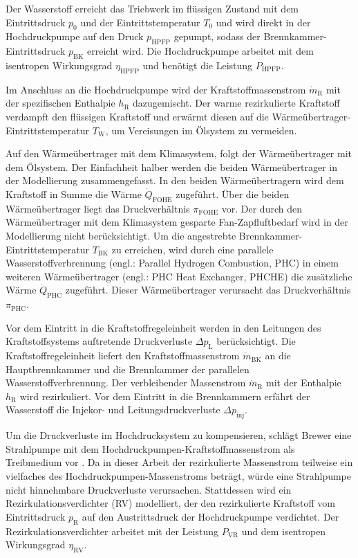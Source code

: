 Der Wasserstoff erreicht das Triebwerk im flüssigen Zustand mit dem Eintrittsdruck $p_0$ und der Eintrittstemperatur $T_0$ und wird direkt in der Hochdruckpumpe auf den Druck $p_{\mathrm{HPFP}}$ gepumpt, sodass der Brennkammer-Eintrittsdruck $p_{\mathrm{BK}}$ erreicht wird. Die Hochdruckpumpe arbeitet mit dem isentropen Wirkungsgrad $\eta_{\mathrm{HPFP}}$ und benötigt die Leistung $P_{\mathrm{HPFP}}$. 

Im Anschluss an die Hochdruckpumpe wird der Kraftstoffmassenstrom $\dot{m}_\mathrm{R}$ mit der spezifischen Enthalpie $h_\mathrm{R}$ dazugemischt. Der warme rezirkulierte Kraftstoff verdampft den flüssigen Kraftstoff und erwärmt diesen auf die Wärmeübertrager-Eintrittstemperatur $T_\mathrm{W}$, um Vereisungen im Ölsystem zu vermeiden.

Auf den Wärmeübertrager mit dem Klimasystem, folgt der Wärmeübertrager mit dem Ölsystem. Der Einfachheit halber werden die beiden Wärmeübertrager in der Modellierung zusammengefasst. In den beiden Wärmeübertragern wird dem Kraftstoff in Summe die Wärme $\dot{Q}_{\mathrm{FOHE}}$ zugeführt. Über die beiden Wärmeübertrager liegt das Druckverhältnis $\pi_{\mathrm{FOHE}}$ vor. Der durch den Wärmeübertrager mit dem Klimasystem gesparte Fan-Zapfluftbedarf wird in der Modellierung nicht berücksichtigt. Um die angestrebte Brennkammer-Eintrittstemperatur $T_{\mathrm{BK}}$ zu erreichen, wird durch eine parallele Wasserstoffverbrennung (engl.: Parallel Hydrogen Combustion, PHC) in einem weiteren Wärmeübertrager (engl.: PHC Heat Exchanger, PHCHE) die zusätzliche Wärme $\dot{Q}_{\mathrm{PHC}}$ zugeführt. Dieser Wärmeübertrager verursacht das Druckverhältnis $\pi_{\mathrm{PHC}}$. 

Vor dem Eintritt in die Kraftstoffregeleinheit werden in den Leitungen des Kraftstoffsystems auftretende Druckverluste $\Delta p_\mathrm{L}$  berücksichtigt. Die Kraftstoffregeleinheit liefert den Kraftstoffmassenstrom $\dot{m}_{\mathrm{BK}}$ an die Hauptbrennkammer und die Brennkammer der parallelen Wasserstoffverbrennung. Der verbleibender Massenstrom $\dot{m}_\mathrm{R}$ mit der Enthalpie $h_\mathrm{R}$ wird rezirkuliert. Vor dem Eintritt in die Brennkammern erfährt der Wasserstoff die Injekor- und Leitungsdruckverluste $\Delta p_{\mathrm{inj}}$. 

Um die Druckverluste im Hochdrucksystem zu kompensieren, schlägt Brewer eine Strahlpumpe mit dem  Hochdruckpumpen-Kraftstoffmassenstrom als Treibmedium vor \cite{Brewer.1991}. Da in dieser Arbeit der rezirkulierte Massenstrom teilweise ein vielfaches des Hochdruckpumpen-Massenstroms beträgt, würde eine Strahlpumpe nicht hinnehmbare Druckverluste verursachen. Stattdessen wird ein Rezirkulationsverdichter (RV) modelliert, der den rezirkulierte Kraftstoff vom Eintrittsdruck $p_\mathrm{R}$ auf den Austrittsdruck der Hochdruckpumpe verdichtet. Der Rezirkulationsverdichter arbeitet mit der Leistung $P_\mathrm{VR}$ und dem isentropen Wirkungsgrad $\eta_\mathrm{RV}$. 

